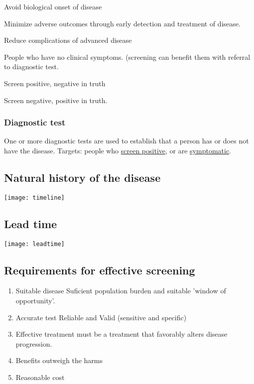 \documentclass[landscape]{article}
\newcommand{\squeezeup}{\vspace{-5mm}}
\newcommand{\squeezeupp}{\vspace{-2mm}}
\begin{document}
\begin{multicols}{3}
			\begin{description}
				\item[Primary]Avoid biological onset of disease
				\item[Secondary] Minimize adverse outcomes through early detection and treatment of disease.
				\item[Tertiary] Reduce complications of advanced disease
				\item[Asymptomatic] People who have no clinical symptoms. (screening can benefit them with referral to diagnostic test.
				\item[False Positive] Screen positive, negative in truth
				\item[False Negative] Screen negative, positive in truth.
			\end{description}

		\squeezeupp{}
		\subsubsection{Diagnostic test}
		\squeezeupp{}
			One or more diagnostic tests are used to establish that a person has or does not have the disease. Targets: people who \underline{screen positive}, or are \underline{symptomatic}.

	\squeezeupp{}
	\subsection{Natural history of the disease}
	\squeezeupp{}
		\texttt{[image: timeline]} %
			
	\squeezeup{}
	\subsection{Lead time}
		\texttt{[image: leadtime]} %
	
	\squeezeup{}\squeezeupp{}
	\subsection{Requirements for effective screening}

		\squeezeupp{}
		\begin{enumerate}
			\item{Suitable disease} Suficient population burden and suitable 'window of opportunity'.
			\item{Accurate test} Reliable and Valid (sensitive and specific)
			\item{Effective treatment} must be a treatment that favorably alters disease progression.
			\item{Benefits outweigh the harms}
			\item{Reasonable cost}
		\end{enumerate}
	

\end{multicols}
\end{document}
